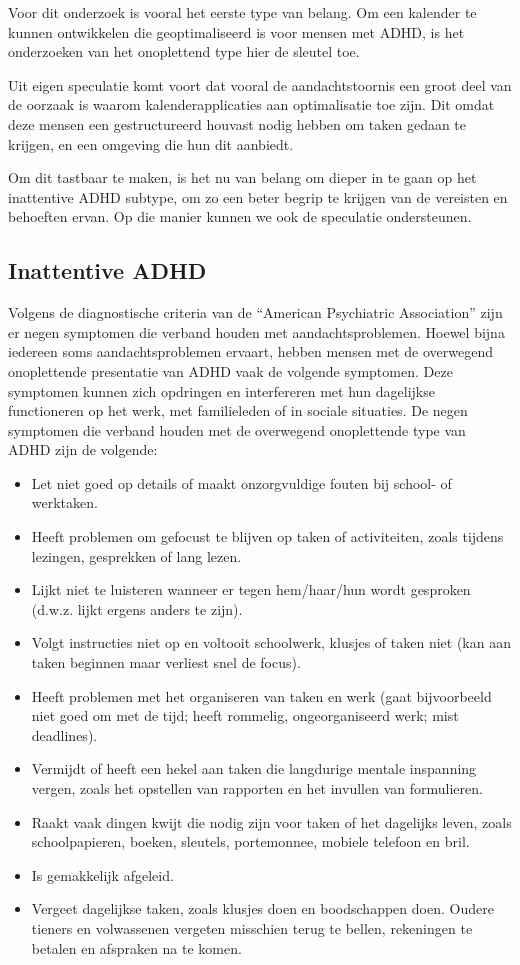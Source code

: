 Voor dit onderzoek is vooral het eerste type van belang. Om een kalender te kunnen ontwikkelen die geoptimaliseerd is voor mensen met ADHD, is het onderzoeken van het onoplettend type hier de sleutel toe.\newline

Uit eigen speculatie komt voort dat vooral de aandachtstoornis een groot deel van de oorzaak is waarom kalenderapplicaties aan optimalisatie toe zijn. Dit omdat deze mensen een gestructureerd houvast nodig hebben om taken gedaan te krijgen, en een omgeving die hun dit aanbiedt. \newline

Om dit tastbaar te maken, is het nu van belang om dieper in te gaan op het inattentive ADHD subtype, om zo een beter begrip te krijgen van de vereisten en behoeften ervan. Op die manier kunnen we ook de speculatie ondersteunen.
\subsection{Inattentive ADHD}
Volgens de diagnostische criteria van de “American Psychiatric Association” zijn er negen symptomen die verband houden met aandachtsproblemen. Hoewel bijna iedereen soms aandachtsproblemen ervaart, hebben mensen met de overwegend onoplettende presentatie van ADHD vaak de volgende symptomen. Deze symptomen kunnen zich opdringen en interfereren met hun dagelijkse functioneren op het werk, met familieleden of in sociale situaties. De negen symptomen die verband houden met de overwegend onoplettende type van ADHD zijn de volgende: 
\begin{itemize}
    \item Let niet goed op details of maakt onzorgvuldige fouten bij school- of werktaken.
    \item Heeft problemen om gefocust te blijven op taken of activiteiten, zoals tijdens lezingen, gesprekken of lang lezen.
    \item Lijkt niet te luisteren wanneer er tegen hem/haar/hun wordt gesproken (d.w.z. lijkt ergens anders te zijn).
    \item Volgt instructies niet op en voltooit schoolwerk, klusjes of taken niet (kan aan taken beginnen maar verliest snel de focus).
    \item Heeft problemen met het organiseren van taken en werk (gaat bijvoorbeeld niet goed om met de tijd; heeft rommelig, ongeorganiseerd werk; mist deadlines).
    \item Vermijdt of heeft een hekel aan taken die langdurige mentale inspanning vergen, zoals het opstellen van rapporten en het invullen van formulieren.
    \item Raakt vaak dingen kwijt die nodig zijn voor taken of het dagelijks leven, zoals schoolpapieren, boeken, sleutels, portemonnee, mobiele telefoon en bril.
    \item Is gemakkelijk afgeleid.
    \item Vergeet dagelijkse taken, zoals klusjes doen en boodschappen doen. Oudere tieners en volwassenen vergeten misschien terug te bellen, rekeningen te betalen en afspraken na te komen.  
\end{itemize} \autocite{elmaghraby2022what} \newline


